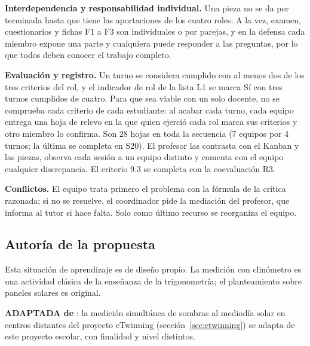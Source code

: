 \textbf{Interdependencia y responsabilidad individual.} Una pieza no se da por terminada hasta que tiene las aportaciones de los cuatro roles. A la vez, examen, cuestionarios y fichas F1 a F3 son individuales o por parejas, y en la defensa cada miembro expone una parte y cualquiera puede responder a las preguntas, por lo que todos deben conocer el trabajo completo.

\textbf{Evaluación y registro.} Un turno se considera cumplido con al menos dos de los tres criterios del rol, y el indicador de rol de la lista L1 se marca Sí con tres turnos cumplidos de cuatro. Para que sea viable con un solo docente, no se comprueba cada criterio de cada estudiante: al acabar cada turno, cada equipo entrega una hoja de relevo en la que quien ejerció cada rol marca sus criterios y otro miembro lo confirma. Son 28 hojas en toda la secuencia (7 equipos por 4 turnos; la última se completa en S20). El profesor las contrasta con el Kanban y las piezas, observa cada sesión a un equipo distinto y comenta con el equipo cualquier discrepancia. El criterio 9.3 se completa con la coevaluación R3.

\textbf{Conflictos.} El equipo trata primero el problema con la fórmula de la crítica razonada; si no se resuelve, el coordinador pide la mediación del profesor, que informa al tutor si hace falta. Solo como último recurso se reorganiza el equipo.

\subsection{Autoría de la propuesta}
Esta situación de aprendizaje es de diseño propio. La medición con clinómetro es una actividad clásica de la enseñanza de la trigonometría; el planteamiento sobre paneles solares es original.

\textbf{ADAPTADA de} \textcite{eratostenes}: la medición simultánea de sombras al mediodía solar en centros distantes del proyecto eTwinning (sección~\ref{sec:etwinning}) se adapta de este proyecto escolar, con finalidad y nivel distintos.

\clearpage
